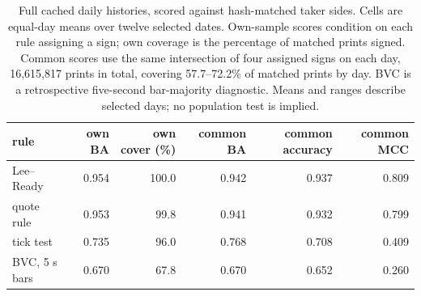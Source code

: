\begin{table}[htbp]
\centering\footnotesize\setlength{\tabcolsep}{3.5pt}
\begin{tabular}{lrrrrr}
\toprule
rule & own BA & own cover (\%) & common BA & common accuracy & common MCC \\
\midrule
Lee--Ready & 0.954 & 100.0 & 0.942 & 0.937 & 0.809 \\
quote rule & 0.953 & 99.8 & 0.941 & 0.932 & 0.799 \\
tick test & 0.735 & 96.0 & 0.768 & 0.708 & 0.409 \\
BVC, 5 s bars & 0.670 & 67.8 & 0.670 & 0.652 & 0.260 \\
\bottomrule
\end{tabular}
\caption{Full cached daily histories, scored against hash-matched taker sides. Cells are equal-day means over twelve selected dates. Own-sample scores condition on each rule assigning a sign; own coverage is the percentage of matched prints signed. Common scores use the same intersection of four assigned signs on each day, 16{,}615{,}817 prints in total, covering 57.7--72.2\% of matched prints by day. BVC is a retrospective five-second bar-majority diagnostic. Means and ranges describe selected days; no population test is implied.}
\label{tab:cached-benchmark}
\end{table}
